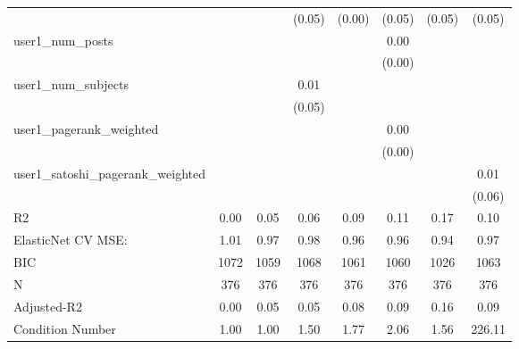 \begin{table}
\begin{center}
\begin{tabular}{lccccccc}
                                               &          &            & (0.05)  & (0.00)  & (0.05)   & (0.05)             & (0.05)   \\
user1_num_posts                                &          &            &         &         & 0.00     &                    &          \\
                                               &          &            &         &         & (0.00)   &                    &          \\
user1_num_subjects                             &          &            & 0.01    &         &          &                    &          \\
                                               &          &            & (0.05)  &         &          &                    &          \\
user1_pagerank_weighted                        &          &            &         &         & 0.00     &                    &          \\
                                               &          &            &         &         & (0.00)   &                    &          \\
user1_satoshi_pagerank_weighted                &          &            &         &         &          &                    & 0.01     \\
                                               &          &            &         &         &          &                    & (0.06)   \\
R2                                             & 0.00     & 0.05       & 0.06    & 0.09    & 0.11     & 0.17               & 0.10     \\
ElasticNet CV MSE:                             & 1.01     & 0.97       & 0.98    & 0.96    & 0.96     & 0.94               & 0.97     \\
BIC                                            & 1072     & 1059       & 1068    & 1061    & 1060     & 1026               & 1063     \\
N                                              & 376      & 376        & 376     & 376     & 376      & 376                & 376      \\
Adjusted-R2                                    & 0.00     & 0.05       & 0.05    & 0.08    & 0.09     & 0.16               & 0.09     \\
Condition Number                               & 1.00     & 1.00       & 1.50    & 1.77    & 2.06     & 1.56               & 226.11   \\
\hline
\end{tabular}
\end{center}
\end{table}
